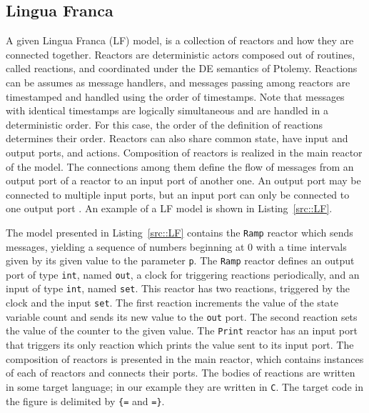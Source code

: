 \subsection{Lingua Franca}

\newcommand{\ReName}[0]{\mathit{ReName}}
\newcommand{\outport}[0]{\mathit{out}}
\newcommand{\inport}[0]{\mathit{in}}
\newcommand{\action}[0]{\mathit{ac}}
\newcommand{\reaction}[0]{\mathit{Reaction}}


A given Lingua Franca (LF) model, is a collection of reactors and how they are connected together. Reactors are deterministic actors composed out of routines, called reactions, and coordinated under the DE semantics of Ptolemy. Reactions can be assumes as message handlers, and messages passing among reactors are timestamped and handled using the order of timestamps. Note that messages with identical timestamps are logically simultaneous and are handled in a deterministic order. For this case, the order of the definition of reactions determines their order. Reactors can also  share common state, have input and output ports, and actions. Composition of reactors is realized in the main reactor of the model. The connections among them define the flow of messages from an output port of a reactor to an input port of another one. An output port may be connected to multiple input ports, but an input port can only be connected to one output port \cite{DBLP:conf/cyphy/LohstrohRGDCLS19}. An example of a LF model is shown in Listing~\ref{src::LF}. 

\begin{example} 
The model presented in Listing~\ref{src::LF} contains the \texttt{Ramp} reactor which sends messages, yielding a sequence of numbers beginning at 0 with a time intervals given by its given value to the parameter \texttt{p}. The \texttt{Ramp} reactor defines an output port of type \texttt{int}, named \texttt{out}, a clock for triggering reactions periodically, and an input of type \texttt{int}, named \texttt{set}. This reactor has two reactions,  triggered by the clock and the input \texttt{set}. The first reaction increments the value of the state variable count and sends its new value to the \texttt{out} port. The second reaction sets the value of the counter to the given value. The \texttt{Print} reactor has an input port that triggers its only reaction which prints the value sent to its input port. The composition of reactors is presented in the main reactor, which contains instances of each of reactors and connects their ports. The bodies of reactions are written in some target language; in our example they are written in \texttt{C}. The target code in the figure is delimited by \texttt{\{=} and \texttt{=\}}.
\end{example} 

